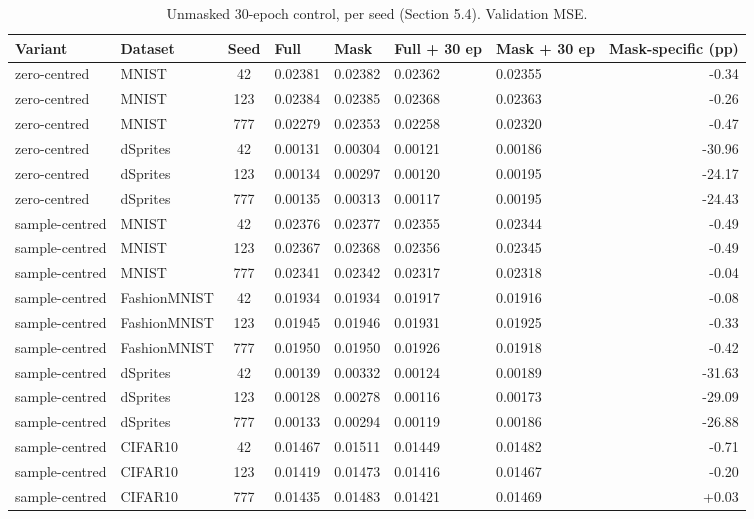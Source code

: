 \begin{table}[t]
\caption{Unmasked 30-epoch control, per seed (Section 5.4). Validation MSE.}
\label{tab:full-control-seeds}
\begin{tabularx}{\textwidth}{llcXXXXr}
\toprule
Variant & Dataset & Seed & Full & Mask & Full + 30 ep & Mask + 30 ep & Mask-specific (pp) \\
\midrule
zero-centred & MNIST & 42 & 0.02381 & 0.02382 & 0.02362 & 0.02355 & -0.34 \\
zero-centred & MNIST & 123 & 0.02384 & 0.02385 & 0.02368 & 0.02363 & -0.26 \\
zero-centred & MNIST & 777 & 0.02279 & 0.02353 & 0.02258 & 0.02320 & -0.47 \\
zero-centred & dSprites & 42 & 0.00131 & 0.00304 & 0.00121 & 0.00186 & -30.96 \\
zero-centred & dSprites & 123 & 0.00134 & 0.00297 & 0.00120 & 0.00195 & -24.17 \\
zero-centred & dSprites & 777 & 0.00135 & 0.00313 & 0.00117 & 0.00195 & -24.43 \\
sample-centred & MNIST & 42 & 0.02376 & 0.02377 & 0.02355 & 0.02344 & -0.49 \\
sample-centred & MNIST & 123 & 0.02367 & 0.02368 & 0.02356 & 0.02345 & -0.49 \\
sample-centred & MNIST & 777 & 0.02341 & 0.02342 & 0.02317 & 0.02318 & -0.04 \\
sample-centred & FashionMNIST & 42 & 0.01934 & 0.01934 & 0.01917 & 0.01916 & -0.08 \\
sample-centred & FashionMNIST & 123 & 0.01945 & 0.01946 & 0.01931 & 0.01925 & -0.33 \\
sample-centred & FashionMNIST & 777 & 0.01950 & 0.01950 & 0.01926 & 0.01918 & -0.42 \\
sample-centred & dSprites & 42 & 0.00139 & 0.00332 & 0.00124 & 0.00189 & -31.63 \\
sample-centred & dSprites & 123 & 0.00128 & 0.00278 & 0.00116 & 0.00173 & -29.09 \\
sample-centred & dSprites & 777 & 0.00133 & 0.00294 & 0.00119 & 0.00186 & -26.88 \\
sample-centred & CIFAR10 & 42 & 0.01467 & 0.01511 & 0.01449 & 0.01482 & -0.71 \\
sample-centred & CIFAR10 & 123 & 0.01419 & 0.01473 & 0.01416 & 0.01467 & -0.20 \\
sample-centred & CIFAR10 & 777 & 0.01435 & 0.01483 & 0.01421 & 0.01469 & +0.03 \\
\bottomrule
\end{tabularx}
\end{table}